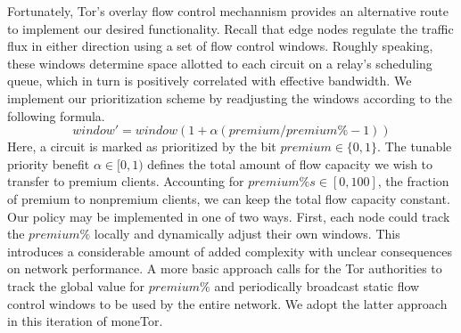Fortunately, Tor's overlay flow control mechannism provides an alternative route
to implement our desired functionality. Recall that edge nodes regulate the traffic
flux in either direction using a set of flow control windows. Roughly speaking,
these windows determine space allotted to each circuit on a relay's scheduling
queue, which in turn is positively correlated with effective bandwidth. We
implement our prioritization scheme by readjusting the windows according to the
following formula.
\begin{equation}
  window' = window(1+ \alpha(premium / premium\% - 1))
  \label{eq:flow}
\end{equation}
Here, a circuit is marked as prioritized by the bit $premium \in \{0, 1\}$. The
tunable priority benefit $\alpha \in [0, 1)$ defines the total amount of flow
capacity we wish to transfer to premium clients. Accounting for
$premium\%s \in [0,100]$, the fraction of premium to nonpremium clients, we can
keep the total flow capacity constant. Our policy may be implemented in one of
two ways. First, each node could track the $premium\%$ locally and dynamically
adjust their own windows. This introduces a considerable amount of added
complexity with unclear consequences on network performance. A more basic
approach calls for the Tor authorities to track the global value for $premium\%$
and periodically broadcast static flow control windows to be used by the entire
network. We adopt the latter approach in this iteration of moneTor.\
